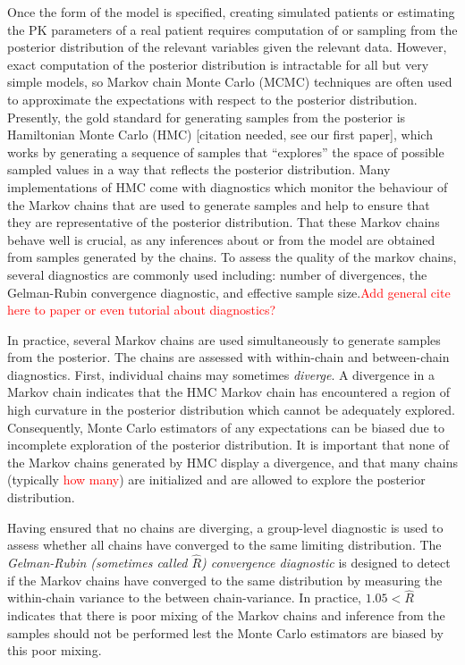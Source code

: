 Once the form of the model is specified, creating simulated patients or estimating the PK parameters of a real patient requires computation of or sampling from the posterior distribution of the relevant variables given the relevant data. However, exact computation of the posterior distribution is intractable for all but very simple models, so Markov chain Monte Carlo (MCMC) techniques are often used to approximate the expectations with respect to the posterior distribution.  Presently, the gold standard for generating samples from the posterior is Hamiltonian Monte Carlo (HMC) [citation needed, see our first paper], which works by generating a sequence of samples that ``explores'' the space of possible sampled values in a way that reflects the posterior distribution.  Many implementations of HMC come with diagnostics which monitor the behaviour of the Markov chains that are used to generate samples and help to ensure that they are representative of the posterior distribution. That these Markov chains behave well is crucial, as any inferences about or from the model are obtained from samples generated by the chains. To assess the quality of the markov chains, several diagnostics are commonly used including: number of divergences, the Gelman-Rubin convergence diagnostic, and effective sample size.\textcolor{red}{Add general cite here to paper or even tutorial about diagnostics?}

In practice, several Markov chains are used simultaneously to generate samples from the posterior. The chains are assessed with within-chain and between-chain diagnostics. First, individual chains may sometimes \textit{diverge}. A divergence in a Markov chain indicates that the HMC Markov chain has encountered a region of high curvature in the posterior distribution which cannot be adequately explored.  Consequently, Monte Carlo estimators of any expectations can be biased due to incomplete exploration of the posterior distribution.  It is important that none of the Markov chains generated by HMC display a divergence, and that many chains (typically \textcolor{red}{how many}) are initialized and are allowed to explore the posterior distribution. 

Having ensured that no chains are diverging, a group-level diagnostic is used to assess whether all chains have converged to the same limiting distribution.  The \textit{Gelman-Rubin (sometimes called $\hat{R}$) convergence diagnostic} is designed to detect if the Markov chains have converged to the same distribution by measuring the within-chain variance to the between chain-variance. In practice, $1.05<\hat{R}$ indicates that there is poor mixing of the Markov chains and inference from the samples should not be performed lest the Monte Carlo estimators are biased by this poor mixing.

